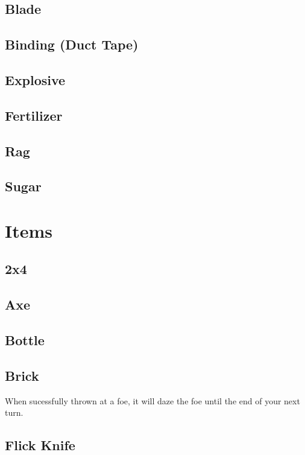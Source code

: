 \documentclass[10pt,twoside,twocolumn]{book}
\begin{document}
\subsection{Blade}

\subsection{Binding (Duct Tape)}

\subsection{Explosive}

\subsection{Fertilizer}

\subsection{Rag}

\subsection{Sugar}

\section{Items}

\subsection{2x4}

\subsection{Axe}

\subsection{Bottle}

\subsection{Brick}

When sucessfully thrown at a foe, it will daze the foe until the end of your next turn.

\subsection{Flick Knife}
\end{document}
